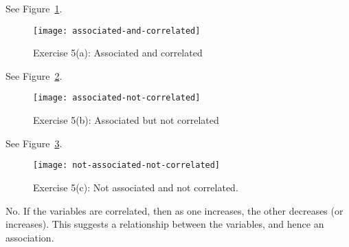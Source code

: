 \documentclass[12pt]{article}
\begin{document}
\begin{enumerate}

\end{enumerate}



\begin{enumerate}


See Figure~\ref{fig:associated-and-correlated}.
\begin{figure}
	\centering
	\texttt{[image: associated-and-correlated]}
	\caption{Exercise 5(a): Associated and correlated}
	\label{fig:associated-and-correlated}
\end{figure}


See Figure~\ref{fig:associated-not-correlated}.
\begin{figure}
	\centering
	\texttt{[image: associated-not-correlated]}
	\caption{Exercise 5(b): Associated but not correlated}
	\label{fig:associated-not-correlated}
\end{figure}


See Figure~\ref{fig:not-associated-not-correlated}.
\begin{figure}
	\centering
	\texttt{[image: not-associated-not-correlated]}
	\caption{Exercise 5(c): Not associated and not correlated.}
	\label{fig:not-associated-not-correlated}
\end{figure}


No. If the variables are correlated, then as one increases, the other decreases (or increases). 
This suggests a relationship between the variables, and hence an association.

\end{enumerate}
\end{document}

